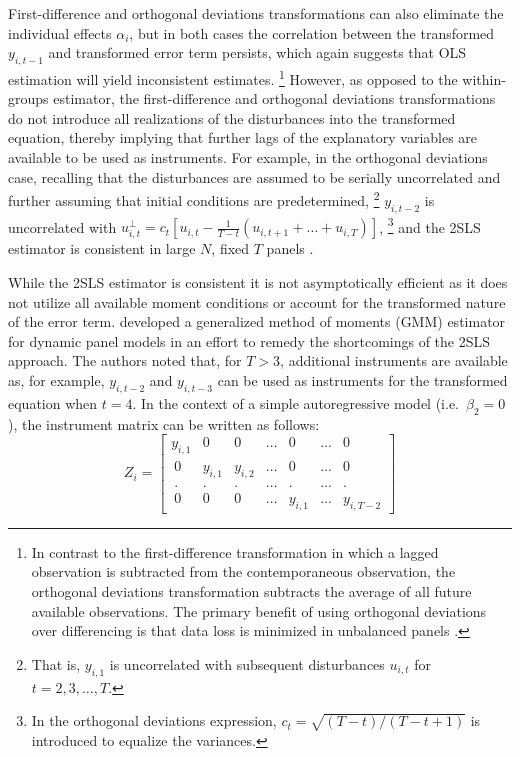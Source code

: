 \documentclass[english]{article}
\begin{document}
First-difference and orthogonal deviations transformations can also eliminate 
the individual effects $\alpha_i$, but in both cases the correlation between the 
transformed $y_{i,t-1}$ and transformed error term persists, which again 
suggests that OLS estimation will yield inconsistent estimates.%
\footnote{In contrast to the first-difference transformation in which a lagged 
observation is subtracted from the contemporaneous observation, the 
orthogonal deviations transformation subtracts the average of all future 
available observations. 
The primary benefit of using orthogonal deviations over differencing is that 
data loss is minimized in unbalanced panels \citep{arellano1995}.} 
However, as opposed to the within-groups estimator, the first-difference and 
orthogonal deviations transformations do not introduce all realizations of the 
disturbances into the transformed equation, thereby implying that further lags 
of the explanatory variables are available to be used as instruments. 
For example, in the orthogonal deviations case, recalling that the disturbances 
are assumed to be serially uncorrelated and further assuming that initial 
conditions are predetermined,%
\footnote{That is, $y_{i,1}$ is uncorrelated with subsequent disturbances 
$u_{i,t}$ for $t=2,3,\ldots,T$.} 
$y_{i,t-2}$ is uncorrelated with $u_{i,t}^{\perp} = c_t\left[u_{i,t} - 
\frac{1}{T - t }\left(u_{i,t + 1} + \ldots + u_{i,T} \right) \right]$,%
\footnote{In the orthogonal deviations expression, $c_t = 
\sqrt{(T - t)/(T - t + 1)}$ is introduced to equalize the variances.} 
and the 2SLS estimator is consistent in large $N$, fixed $T$ panels 
\citep{anderson1982, arellano1995, bond2002, roodman2009}.

While the 2SLS estimator is consistent it is not asymptotically efficient as it 
does not utilize all available moment conditions or account for the 
transformed nature of the error term. 
\citet{arellano1991} developed a generalized method of moments (GMM) 
estimator for dynamic panel models in an effort to remedy the shortcomings 
of the 2SLS approach. 
The authors noted that, for $T>3$, additional instruments are available as, 
for example, $y_{i,t-2}$ and $y_{i,t-3}$ can be used as instruments for the 
transformed equation when $t=4$.
In the context of a simple autoregressive model (i.e.\ $\beta_2=0$), the 
instrument matrix can be written as follows:
\begin{equation}
Z_i = \left[ 
\begin{array}{ccccccc}
y_{i,1} & 0 & 0  & \ldots  & 0 & \ldots & 0 \\\
0 & y_{i,1} & y_{i,2}  & \ldots  & 0 & \ldots & 0 \\\
. & . & .  & \ldots  & . & \ldots & . \\\
0 & 0 & 0  & \ldots  & y_{i,1} & \ldots & y_{i,T-2}
\end{array}
\right]
\label{z}
\end{equation}
\end{document}
